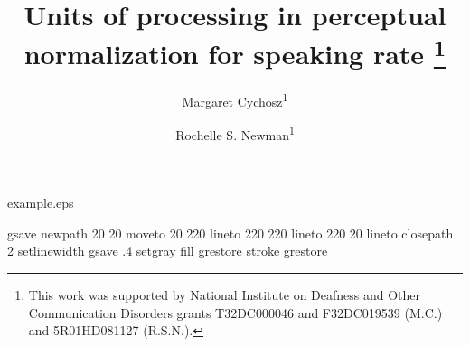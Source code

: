 %
%
%
%
%
\begin{filecontents*}{example.eps}

gsave
newpath
  20 20 moveto
  20 220 lineto
  220 220 lineto
  220 20 lineto
closepath
2 setlinewidth
gsave
  .4 setgray fill
grestore
stroke
grestore
\end{filecontents*}
%
\RequirePackage{fix-cm}
%
\documentclass[smallcondensed,natbib,apacite]{svjour3}       %

\smartqed  %
\usepackage{graphicx}
\usepackage{makecell}
\usepackage{multirow}
\usepackage[T1]{tipa}
\usepackage{hyperref} %
\usepackage{float} %
\usepackage{indentfirst} %
\usepackage{setspace} %
\doublespacing

%


\title{Units of processing in perceptual normalization for speaking rate \thanks{This work was supported by National Institute on Deafness and Other Communication Disorders grants T32DC000046 and F32DC019539 (M.C.) and 5R01HD081127 (R.S.N.).}}




\author{Margaret Cychosz\textsuperscript{1} \and
        Rochelle S. Newman\textsuperscript{1}
}



